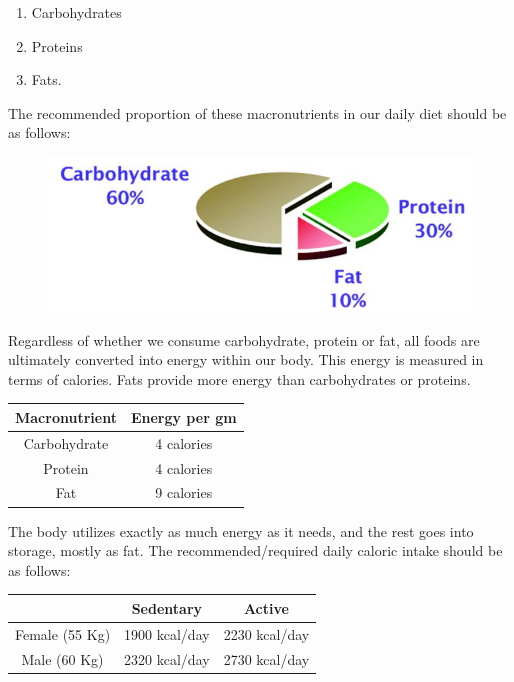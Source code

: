 \begin{enumerate}
\itemsep=0pt
\item Carbohydrates
\item Proteins
\item Fats.
\end{enumerate}

The recommended proportion of these macronutrients in our daily diet should be as follows:

\begin{figure}[h]
\centering
\includegraphics[scale=1.5]{images/078.jpg}
\end{figure}

Regardless of whether we consume carbohydrate, protein or fat, all foods are ultimately converted into energy within our body. This energy is measured in terms of calories. Fats provide more energy than carbohydrates or proteins.

\begin{center}
\begin{tabular}{|c|c|}
\hline
\textbf{Macronutrient} & \textbf{Energy per gm}\\
\hline
Carbohydrate & 4 calories\\
\hline
Protein & 4 calories\\
\hline
Fat & 9 calories\\
\hline
\end{tabular}
\end{center}

The body utilizes exactly as much energy as it needs, and the rest goes into storage, mostly as fat. The recommended/required daily caloric intake should be as follows:

\begin{center}
\begin{tabular}{|c|c|c|}
\hline
 & \textbf{Sedentary} & \textbf{Active}\\
\hline
Female (55 Kg) & 1900 kcal/day & 2230 kcal/day\\
\hline
Male (60 Kg) & 2320 kcal/day & 2730 kcal/day\\
\hline
\end{tabular}
\end{center}

